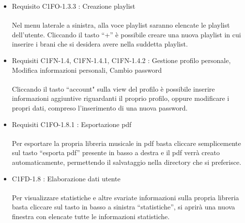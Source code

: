 \begin{itemize}
  \item Requisito C1FO-1.3.3 : Creazione playlist\\
  \\Nel menu laterale a sinistra, alla voce playlist saranno elencate le
  playlist dell'utente. Cliccando il tasto ``+'' \`e possibile creare una nuova playlist
  in cui inserire i brani che si desidera avere nella suddetta playlist.
  
  \item Requisiti C1FN-1.4, C1FN-1.4.1, C1FN-1.4.2 : Gestione profilo personale,
  Modifica informazioni personali, Cambio password\\ 
  \\Cliccando il tasto ``account" sulla
  view del profilo \`e possibile inserire informazioni aggiuntive riguardanti il proprio profilo, oppure modificare i
  propri dati, compreso l'inserimento di una nuova password.
  
  \item Requisiti C1FO-1.8.1 : Esportazione pdf\\
  \\Per esportare la propria libreria musicale in pdf basta cliccare
  semplicemente sul tasto ``esporta pdf'' presente in basso a destra e il pdf verr\`a creato
  automaticamente, permettendo il salvataggio nella directory che si preferisce.
  
  \item C1FD-1.8 : Elaborazione dati utente\\
  \\Per visualizzare statistiche e altre svariate informazioni sulla propria
  libreria basta cliccare sul tasto in basso a sinistra ``statistiche'', si aprir\`a una
  nuova finestra con elencate tutte le informazioni statistiche.
  

\end{itemize}
